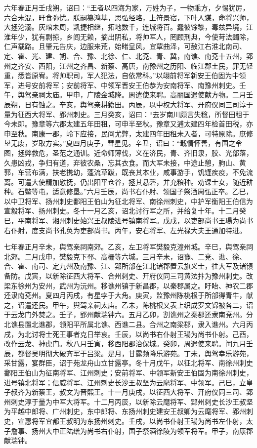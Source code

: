 \documentclass[]{article}
\begin{document}
六年春正月壬戌朔，诏曰：``王者以四海为家，万姓为子，一物乖方，夕惕犹厉，六合未混，旰食弥忧。朕嗣纂鸿基，思弘经略，上符景宿，下叶人谋，命将兴师，大拯沦溺。灰琯未周，凯捷相继，拓地数千，连城将百。蠢彼馀黎，毒兹异境，江淮年少，犹有剽掠，乡闾无赖，摘出阴私，将帅军人，罔顾刑典，今使苛法蠲除，仁声载路。且肇元告庆，边服来荒，始睹皇风，宜覃曲泽，可赦江右淮北南司、定、霍、光、建、朔、合、豫、北徐、仁、北兗、青、冀，南谯、南兗十五州，郢州之齐安、西阳，江州之齐昌、新蔡、高唐，南豫州之历阳、临江郡土民，罪无轻重，悉皆原宥。将帅职司，军人犯法，自依常科。''以翊前将军新安王伯固为中领军，进号安前将军；安前将军、中领军晋安王伯恭为安南将军、南豫州刺史。壬午，舆驾亲祠太庙。甲申，广陵金城降。周遣使来聘。高丽国遣使献方物。二月壬辰朔，日有蚀之。辛亥，舆驾亲耕籍田。丙辰，以中权大将军、开府仪同三司淳于量为征西大将军、郢州刺史。三月癸亥，诏曰：``去岁南川颇言失稔，所督田租于今未即。豫章等六郡太建五年田租，可申半至秋。豫章又逋太建四年检首田税，亦申至秋。南康一郡，岭下应接，民间尤弊，太建四年田租未入者，可特原除。庶修垦无废，岁取方实。''夏四月庚子，彗星见。辛丑，诏曰：``戢情怀善，有国之令图，拯弊救危，圣范之通训。近命师薄伐，义在济民，青、齐旧隶，胶、光部落，久患凶戎，争归有道，弃彼农桑，忘其衣食。而大军未接，中途止憩，朐山、黄郭，车营布满，扶老携幼，蓬流草跋，既丧其本业，咸事游手，饥馑疾疫，不免流离。可遣大使精加慰抚，仍出阳平仓谷，拯其悬磬，并充粮种。劝课士女，随近耕种。石鳖等屯，适意修垦。''六月壬辰，尚书右仆射、领国子祭酒周弘正卒。乙巳，以中卫将军、扬州刺史鄱阳王伯山为征北将军、南徐州刺史，中护军衡阳王伯信为宣毅将军、扬州刺史。冬十一月乙亥，诏北讨行军之所，并给复十年。十二月癸巳，平南将军、湘州刺史始兴王叔陵进号镇南将军。戊戌，以吏部尚书王瑒为尚书右仆射，度支尚书孔奂为吏部尚书。丙午，安右将军、左光禄大夫王通加特进。

七年春正月辛未，舆驾亲祠南郊。乙亥，左卫将军樊毅克潼州城。辛巳，舆驾亲祠北郊。二月戊申，樊毅克下邳、高栅等六城。三月辛未，诏豫、二兗、谯、徐、合、霍、南司、定九州及南豫、江、郢所部在江北诸郡置云旗义士，往大军及诸镇备防。戊寅，以新除征西大将军、合州刺史、开府仪同三司黄法抃为豫州刺史。改梁东徐州为安州，武州为沅州。移谯州镇于新昌郡，以秦郡属之。盱眙、神农二郡还隶南兗州。夏四月丙戌，有星孛于大角。庚寅，监豫州陈桃根于所部得青牛，献之，诏遣还民。甲午，舆驾亲祠太庙。乙未，陈桃根又表上织成罗文锦被各二，诏于云龙门外焚之。壬子，郢州献瑞钟六。五月乙卯，割谯州之秦郡还隶南兗州。分北谯县置北谯郡，领阳平所属北谯、西谯二县。合州之南梁郡，隶入谯州。六月丙戌，为北讨将士死王事者克日举哀。壬辰，以尚书右仆射王瑒为尚书仆射。己酉，改作云龙、神虎门。秋八月壬寅，移西阳郡治保城。癸卯，周遣使来聘。闰九月壬辰，都督吴明彻大破齐军于吕梁。是月，甘露频降乐游苑。丁未，舆驾幸乐游苑，采甘露，宴群臣，诏于苑龙舟山立甘露亭。冬十月戊午，以征北将军、南徐州刺史鄱阳王伯山为征南将军、江州刺史；安前将军、中领军新安王伯固为南徐州刺史，进号镇北将军；信威将军、江州刺史长沙王叔坚为云麾将军、中领军。己巳，立皇子叔齐为新蔡王，叔文为晋熙王。十一月庚戌，以征西大将军、开府仪同三司、郢州刺史淳于量为中军大将军。十二月丙辰，以新除云麾将军、郢州刺史长沙王叔坚为平越中郎将、广州刺史，东中郎将、东扬州刺史建安王叔卿为云麾将军、郢州刺史，宣惠将军宜都王叔明为东扬州刺史。壬戌，以尚书仆射王瑒为尚书左仆射，太子詹事、扬州大中正陆缮为尚书右仆射，国子祭酒徐陵为领军将军。甲子，南康郡献瑞钟。
\end{document}
